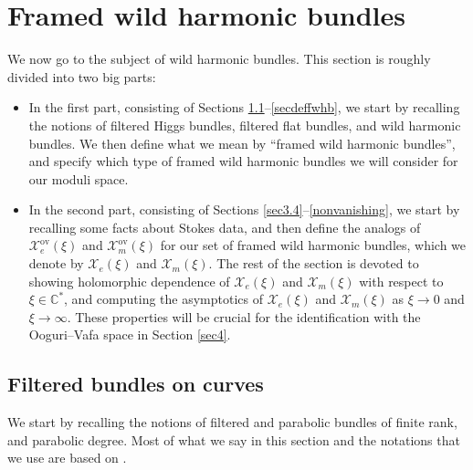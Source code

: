 \section{Framed wild harmonic bundles}\label{sec3}

We now go to the subject of wild harmonic bundles. This section is roughly divided into two big parts:
\begin{itemize}\itemsep=0pt
 \item In the first part, consisting of Sections \ref{filtbunsec}--\ref{secdeffwhb}, we start by recalling the notions of filtered Higgs bundles, filtered flat bundles, and wild harmonic bundles. We then define what we mean by ``framed wild harmonic bundles'', and specify which type of framed wild harmonic bundles we will consider for our moduli space.
 \item In the second part, consisting of Sections \ref{sec3.4}--\ref{nonvanishing}, we start by recalling some facts about Stokes data, and then define the analogs of $\mathcal{X}_e^{\text{ov}}(\xi)$ and $\mathcal{X}_m^{\text{ov}}(\xi)$ for our set of framed wild harmonic bundles, which we denote by $\mathcal{X}_e(\xi)$ and $\mathcal{X}_m(\xi)$. The rest of the section is devoted to showing holomorphic dependence of $\mathcal{X}_e(\xi)$ and $\mathcal{X}_m(\xi)$ with respect to $\xi\in \mathbb{C}^{*}$, and computing the asymptotics of $\mathcal{X}_e(\xi)$ and $\mathcal{X}_m(\xi)$ as $\xi\to 0$ and $\xi\to \infty$. These properties will be crucial for the identification with the Ooguri--Vafa space in Section \ref{sec4}.
\end{itemize}

\subsection{Filtered bundles on curves}\label{filtbunsec}

We start by recalling the notions of filtered \cite{Sim2,Sim} and parabolic bundles \cite{ParBun,ParBun2} of finite rank, and parabolic degree. Most of what we say in this section and the notations that we use are based on \cite{M,M2,M5}.

